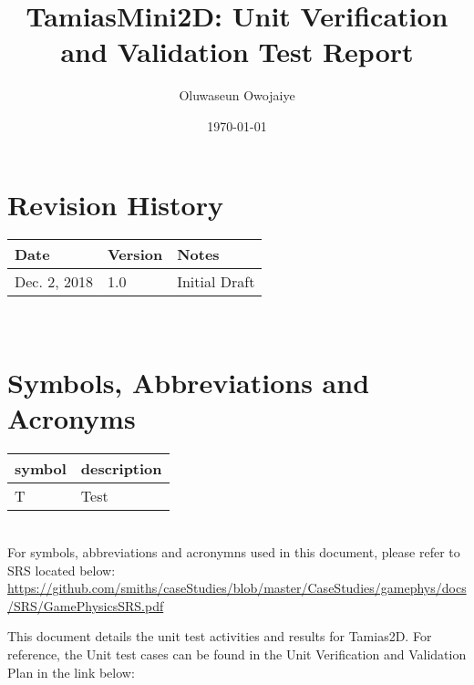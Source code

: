 \documentclass[12pt, titlepage]{article}
\newcommand{\progname}{Tamias2D}
\begin{document}
\title{TamiasMini2D: Unit Verification and Validation Test Report} 
\author{Oluwaseun Owojaiye}
\date{\today}
	
\maketitle


\section{Revision History}

\begin{tabularx}{\textwidth}{p{3cm}p{2cm}X}
\toprule {\bf Date} & {\bf Version} & {\bf Notes}\\
\midrule
Dec. 2, 2018 & 1.0 & Initial Draft\\
\bottomrule
\end{tabularx}

~\newpage

\section{Symbols, Abbreviations and Acronyms}

\renewcommand{\arraystretch}{1.2}
\begin{tabular}{l l} 
  \toprule		
  \textbf{symbol} & \textbf{description}\\
  \midrule 
  T & Test\\
  \bottomrule
\end{tabular}\\


For symbols, abbreviations and acronymns used in this document, please refer to SRS located below: 
\url{https://github.com/smiths/caseStudies/blob/master/CaseStudies/gamephys/docs/SRS/GamePhysicsSRS.pdf}

\newpage

\tableofcontents

\listoftables %

\listoffigures %

\newpage


This document details the unit test activities and results for \progname{}. For reference, the Unit test cases can be found in the Unit Verification and Validation Plan in the link below:
\end{document}
